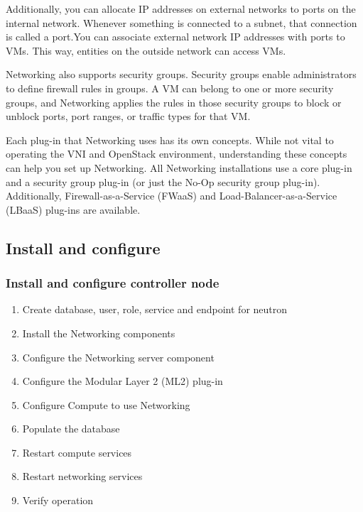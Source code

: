     \par Additionally, you can allocate IP addresses on external networks to ports on the internal network. Whenever something is connected to a subnet, that connection is called a port.You can associate external network IP addresses with ports to VMs. This way, entities on the outside network can access VMs.
    
    \par Networking also supports security groups. Security groups enable administrators to define firewall rules in groups. A VM can belong to one or more security groups, and Networking applies the rules in those security groups to block or unblock ports, port ranges, or traffic types for that VM.
    
    \par Each plug-in that Networking uses has its own concepts. While not vital to operating the VNI and OpenStack environment, understanding these concepts can help you set up Networking. All Networking installations use a core plug-in and a security group plug-in (or just the No-Op security group plug-in). Additionally, Firewall-as-a-Service (FWaaS) and Load-Balancer-as-a-Service (LBaaS) plug-ins are available.

    \subsection{Install and configure}
    
    \subsubsection{Install and configure controller node}
        \begin{enumerate}
            \item Create database, user, role, service and endpoint for neutron
            \item Install the Networking components
            \item Configure the Networking server component
            \item Configure the Modular Layer 2 (ML2) plug-in 
            \item Configure Compute to use Networking 
            \item Populate the database
            \item Restart compute services
            \item Restart networking services        
            \item Verify operation
        \end{enumerate}   
